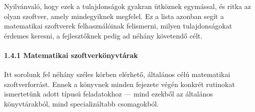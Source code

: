 \documentclass[
  magyar,
  11pt]{article}
\begin{document}
Nyilvánvaló, hogy ezek a tulajdonságok gyakran ütköznek egymással, és
ritka az olyan szoftver, amely mindegyiknek megfelel. Ez a lista azonban
segít a matematikai szoftverek felhasználóinak felismerni, milyen
tulajdonságokat érdemes keresni, a fejlesztőknek pedig ad néhány
követendő célt.

\paragraph{1.4.1 Matematikai
szoftverkönyvtárak}\label{matematikai-szoftverkuxf6nyvtuxe1rak}

Itt sorolunk fel néhány széles körben elérhető, általános célú
matematikai szoftverforrást. Ennek a könyvnek minden fejezete végén
konkrét rutinokat ismertetünk adott típusú feladatokhoz --- mind ezekből
az általános könyvtárakból, mind specializáltabb csomagokból.
\end{document}
